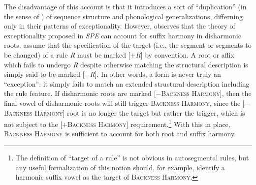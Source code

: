The disadvantage of this account is that it introduces a sort of ``duplication'' (in the sense of \citealt{Kenstowicz1977}) of sequence structure and phonological generalizations, differning only in their patterns of exceptionality.
However, \citet[][197f.]{Zonneveld1978} observes that the theory of exceptionality proposed in \emph{SPE}
can account for suffix harmony in disharmonic roots. \citeauthor{SPE} assume that the specification of the target (i.e., the segment or segments to be changed) of a rule \emph{R} must be marked [$+$\emph{R}] by convention. A root or affix which fails to undergo \emph{R} despite otherwise matching the structural description is simply said to be marked [$-$\emph{R}]. In other words, a form is never truly an ``exception'': it simply fails to match an extended structural description including the rule feature. If disharmonic roots are marked [$-$\textsc{Backness Harmony}], then the final vowel of disharmonic roots will still trigger \textsc{Backness Harmony}, since the [$-$\textsc{Backness Harmony}] root is no longer the target but rather the trigger, which is not subject to the [$+$\textsc{Backness Harmony}] requirement.\footnote{The definition of ``target of a rule'' is not obvious in autosegmental rules, but any useful formalization of this notion should, for example, identify a harmonic suffix vowel as the target of \textsc{Backness Harmony}.} With this in place, \textsc{Backness Harmony} is sufficient to account for both root and suffix harmony.


%

